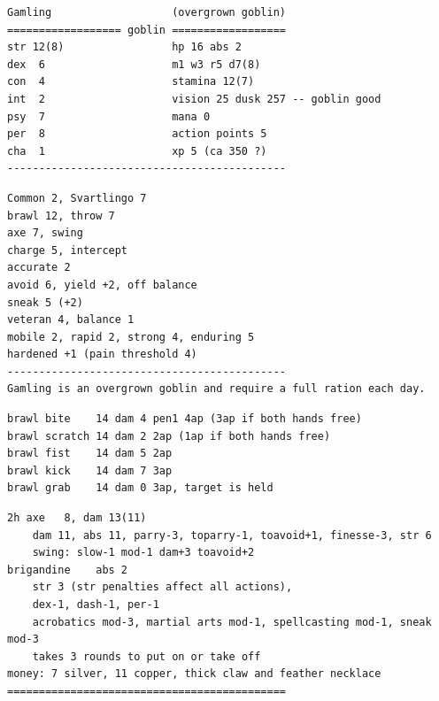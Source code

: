 \small \begin{samepage} \begin{verbatim}
Gamling                   (overgrown goblin)
================== goblin ==================
str 12(8)                 hp 16 abs 2
dex  6                    m1 w3 r5 d7(8)
con  4                    stamina 12(7)
int  2                    vision 25 dusk 257 -- goblin good
psy  7                    mana 0
per  8                    action points 5
cha  1                    xp 5 (ca 350 ?)
--------------------------------------------
\end{verbatim} \end{samepage} \goodbreak \begin{samepage} \begin{verbatim}
Common 2, Svartlingo 7
brawl 12, throw 7
axe 7, swing
charge 5, intercept
accurate 2
avoid 6, yield +2, off balance
sneak 5 (+2)
veteran 4, balance 1 
mobile 2, rapid 2, strong 4, enduring 5
hardened +1 (pain threshold 4)
--------------------------------------------
Gamling is an overgrown goblin and require a full ration each day.
\end{verbatim} \end{samepage} \goodbreak \begin{samepage} \begin{verbatim}
brawl bite    14 dam 4 pen1 4ap (3ap if both hands free)
brawl scratch 14 dam 2 2ap (1ap if both hands free)
brawl fist    14 dam 5 2ap
brawl kick    14 dam 7 3ap
brawl grab    14 dam 0 3ap, target is held
\end{verbatim} \end{samepage} \goodbreak \begin{samepage} \begin{verbatim}
2h axe   8, dam 13(11) 
    dam 11, abs 11, parry-3, toparry-1, toavoid+1, finesse-3, str 6
    swing: slow-1 mod-1 dam+3 toavoid+2
brigandine    abs 2
    str 3 (str penalties affect all actions),
    dex-1, dash-1, per-1
    acrobatics mod-3, martial arts mod-1, spellcasting mod-1, sneak mod-3
    takes 3 rounds to put on or take off
money: 7 silver, 11 copper, thick claw and feather necklace
============================================
\end{verbatim} \end{samepage} \normalsize

\

